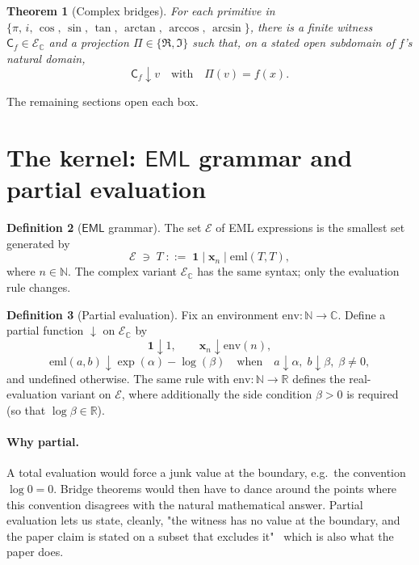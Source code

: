 \documentclass[11pt]{article}
\newcommand{\EML}{\mathsf{EML}}
\newcommand{\Eset}{\mathcal{E}}
\newcommand{\EsetC}{\mathcal{E}_{\mathbb{C}}}
\theoremstyle{plain}
\newtheorem{theorem}{Theorem}
\theoremstyle{definition}
\newtheorem{definition}[theorem]{Definition}
\begin{document}
\begin{theorem}[Complex bridges]
\label{thm:complex-bridges}
For each primitive in $\{\pi,\,i,\,\cos,\,\sin,\,\tan,\,\arctan,\,\arccos,\,\arcsin\}$,
there is a finite witness $\mathsf{C}_f \in \EsetC$ and a projection
$\Pi \in \{\Re,\Im\}$ such that, on a stated open subdomain of $f$'s
natural domain,
\[
  \mathsf{C}_f \downarrow v
  \quad\text{with}\quad
  \Pi(v) = f(x).
\]
\end{theorem}

The remaining sections open each box.

\section{The kernel: \texorpdfstring{$\EML$}{EML} grammar and partial evaluation}

\begin{definition}[$\EML$ grammar]
\label{def:grammar}
The set $\Eset$ of EML expressions is the smallest set generated by
\[
  \Eset \;\ni\; T \;::=\; \mathbf{1} \;\big|\; \mathbf{x}_n \;\big|\;
   \mathrm{eml}(T,T),
\]
where $n\in\mathbb{N}$. The complex variant $\EsetC$ has the same
syntax; only the evaluation rule changes.
\end{definition}

\begin{definition}[Partial evaluation]
\label{def:eval}
Fix an environment $\mathrm{env}: \mathbb{N} \to \mathbb{C}$. Define a
partial function $\downarrow$ on $\EsetC$ by
\[
  \mathbf{1} \downarrow 1, \qquad
  \mathbf{x}_n \downarrow \mathrm{env}(n),
\]
\[
  \mathrm{eml}(a, b) \downarrow \exp(\alpha) - \log(\beta)
  \quad\text{when}\quad a \downarrow \alpha,\;
  b \downarrow \beta,\; \beta \ne 0,
\]
and undefined otherwise. The same rule with $\mathrm{env}:\mathbb{N}\to\mathbb{R}$
defines the real-evaluation variant on $\Eset$, where additionally the
side condition $\beta > 0$ is required (so that $\log\beta\in\mathbb{R}$).
\end{definition}

\paragraph{Why partial.}
A total evaluation would force a junk value at the boundary, e.g.\ the
convention $\log 0 = 0$. Bridge theorems would then have to dance
around the points where this convention disagrees with the natural
mathematical answer. Partial evaluation lets us state, cleanly, "the
witness has no value at the boundary, and the paper claim is stated
on a subset that excludes it" \textemdash\ which is also what the paper
does.
\end{document}
